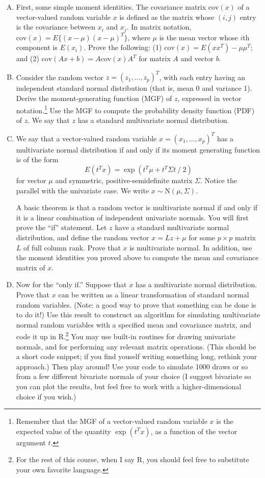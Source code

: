 \documentclass{mynotes}
\newcommand{\N}{\mbox{N}}
\begin{document}
\begin{enumerate}[(A)]

\item First, some simple moment identities.  The covariance matrix $\mbox{cov}(x)$ of a vector-valued random variable $x$ is defined as the matrix whose $(i,j)$ entry is the covariance between $x_i$ and $x_j$.  In matrix notation, $\mbox{cov}(x) = E\{ (x - \mu) (x - \mu)^T \}$, where $\mu$ is the mean vector whose $i$th component is $E(x_i)$.  Prove the following: (1) $\mbox{cov}(x) = E(xx^T) - \mu \mu^T$; and (2) $\mbox{cov}(Ax + b) = A \mbox{cov}(x) A^T$ for matrix $A$ and vector $b$.

\item Consider the random vector $z = (z_1, \ldots, z_p)^T$, with each entry having an independent standard normal distribution (that is, mean 0 and variance 1).  Derive the moment-generating function (MGF) of $z$, expressed in vector notation.\footnote{Remember that the MGF of a vector-valued random variable $x$ is the expected value of the quantity $\exp(t^T x)$, as a function of the vector argument $t$.}  Use the MGF to compute the probability density function (PDF) of $z$.  We say that $z$ has a standard multivariate normal distribution.

\item We say that a vector-valued random variable $x = (x_1, \ldots, x_p)^T$ has a multivariate normal distribution if and only if its moment generating function is of the form
$$
E(t^Tx) = \exp (t^T \mu +  t^T \Sigma t \ / \ 2)
$$
for vector $\mu$ and symmetric, positive-semidefinite matrix $\Sigma$.  Notice the parallel with the univariate case.  We write $x \sim \N(\mu, \Sigma)$.

A basic theorem is that a random vector is multivariate normal if and only if it is a linear combination of independent univariate normals.  You will first prove the ``if'' statement.  Let $z$ have a standard multivariate normal distribution, and define the random vector $x = L z + \mu$ for some $p \times p$ matrix $L$ of full column rank.   Prove that $x$ is multivariate normal.  In addition, use the moment identities you proved above to compute the mean and covariance matrix of $x$.  

\item Now for the ``only if.''  Suppose that $x$ has a multivariate normal distribution.  Prove that $x$ can be written as a linear transformation of standard normal random variables.  (Note: a good way to prove that something can be done is to do it!)  Use this result to construct an algorithm for simulating multivariate normal random variables with a specified mean and covariance matrix, and code it up in R.\footnote{For the rest of this course, when I say R, you should feel free to substitute your own favorite language.}  You may use built-in routines for drawing univariate normals, and for performing any relevant matrix operations.  (This should be a short code snippet; if you find youself writing something long, rethink your approach.)  Then play around!  Use your code to simulate 1000 draws or so from a few different bivariate normals of your choice (I suggest bivariate so you can plot the results, but feel free to work with a higher-dimensional choice if you wish.)


\end{enumerate}
\end{document}
